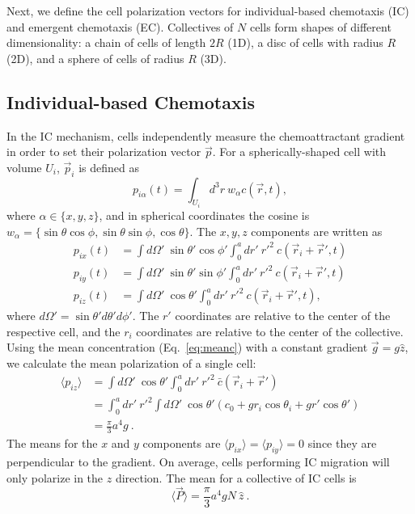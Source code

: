 Next, we define the cell polarization vectors for individual-based chemotaxis (IC) and emergent chemotaxis (EC). Collectives of $N$ cells form shapes of different dimensionality: a chain of cells of length $2R$ (1D), a disc of cells with radius $R$ (2D), and a sphere of cells of radius $R$ (3D).


\subsection{Individual-based Chemotaxis}

In the IC mechanism, cells independently measure the chemoattractant gradient in order to set their polarization vector $\vec{p}$. For a spherically-shaped cell with volume $U_i$, $\vec{p}_i$ is defined as
\begin{equation}
    p_{i\alpha}(t) = \int_{U_i} d^3r \ w_\alpha c(\vec{r},t) ,
\end{equation}
where $\alpha\in\{x,y,z\}$, and in spherical coordinates the cosine is $w_\alpha = \{\sin\theta \cos\phi, \sin\theta \sin\phi, \cos\theta\}$.
The $x, y, z$ components are written as
\begin{align}
    p_{ix}(t) &= \int d\Omega' \ \sin\theta' \cos\phi' \int_0^a dr' \ r'^2 \ c(\vec{r}_i+\vec{r}',t)  \label{eq:3DMWpx} \\
    p_{iy}(t) &= \int d\Omega' \ \sin\theta' \sin\phi' \int_0^a dr' \ r'^2 \ c(\vec{r}_i+\vec{r}',t)  \label{eq:3DMWpy} \\
    p_{iz}(t) &= \int d\Omega' \ \cos\theta' \int_0^a dr' \ r'^2 \ c(\vec{r}_i+\vec{r}',t), \label{eq:3DMWpz}
\end{align}
where $d\Omega' = \sin\theta'd\theta'd\phi'$. The $r'$ coordinates are relative to the center of the respective cell, and the $r_i$ coordinates are relative to the center of the collective.
Using the mean concentration (Eq.\ \ref{eq:meanc}) with a constant gradient $\vec{g} = g \hat{z}$, we calculate the mean polarization of a single cell:
\begin{align*}
    \langle p_{iz} \rangle &= \int d\Omega' \ \cos\theta' \int_0^a dr' \ r'^2 \ \bar{c}(\vec{r}_i+\vec{r}') \\
    &= \int_0^a dr' \ r'^2 \int d\Omega' \ \cos\theta' (c_0+gr_i\cos\theta_i+gr'\cos\theta') \\
    &= \frac{\pi}{3} a^4 g \ .
\end{align*}
The means for the $x$ and $y$ components are $\langle p_{ix} \rangle = \langle p_{iy} \rangle = 0$ since they are perpendicular to the gradient. On average, cells performing IC migration will only polarize in the $z$ direction. The mean for a collective of IC cells is
\begin{equation}
    \langle \vec{P} \rangle = \frac{\pi}{3} a^4 g N \ \hat{z} \ .
\end{equation}


